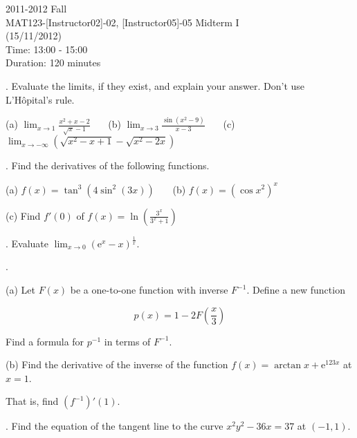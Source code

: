 \documentclass{article}
\begin{document}
\large

\begin{center}
2011-2012 Fall \\MAT123-[Instructor02]-02, [Instructor05]-05 Midterm I\\(15/11/2012)\\Time: 13:00 - 15:00\\Duration: 120 minutes
\end{center}

. Evaluate the limits, if they exist, and explain your answer. Don't use L'Hôpital's rule.

\hfill

(a) $\displaystyle \lim_{x\to 1} \frac{x^2+x-2}{\sqrt x-1}$ \ \ \ (b) $\displaystyle \lim_{x\to 3} \frac{\sin(x^2-9)}{x-3}$ \ \ \ (c) $\displaystyle \lim_{x\to -\infty}\left(\sqrt{x^2-x+1}-\sqrt{x^2-2x}\right)$

\hfill

. Find the derivatives of the following functions.

\hfill

(a) $\displaystyle f(x) = \tan^3\left(4\sin^2(3x)\right)$ \ \ \ (b) $\displaystyle f(x) = \left(\cos x^2\right)^x$

\hfill

(c) Find $f'(0)$ of $\displaystyle f(x)=\ln\left(\frac{3^x}{3^x+1}\right)$

\hfill

. Evaluate $\displaystyle \lim_{x\to0}\left(\mathrm{e}^x-x\right)^{\frac1x}$.

\hfill

.

\hfill

(a) Let $F(x)$ be a one-to-one function with inverse $F^{-1}$. Define a new function

\begin{equation*}
p(x) = 1-2F\left(\frac x3\right)
\end{equation*}

Find a formula for $p^{-1}$ in terms of $F^{-1}$.

\hfill

(b) Find the derivative of the inverse of the function $f(x) = \arctan x + \mathrm{e}^{123x}$ at $x=1$.

That is, find $\left(f^{-1}\right)'(1)$.

\hfill

. Find the equation of the tangent line to the curve $x^2y^2-36x=37$ at $(-1, 1)$.
\end{document}
